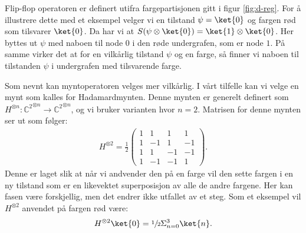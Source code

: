         Flip-flop operatoren er definert utifra fargepartisjonen gitt i figur \ref{fig:d-reg}. For å illustrere dette med et eksempel velger vi en tilstand $\psi=\ket{0}$ og fargen rød som tilsvarer $\ket{0}$. Da har vi at $S(\psi\otimes\ket{0})=\ket{1}\otimes\ket{0}$. Her byttes ut $\psi$ med naboen til node $0$ i den røde undergrafen, som er node $1$. På samme virker det at for en vilkårlig tilstand $\psi$ og en farge, så finner vi naboen til tilstanden $\psi$ i undergrafen med tilsvarende farge.

        Som nevnt kan myntoperatoren velges mer vilkårlig. I vårt tilfelle kan vi velge en mynt som kalles for Hadamardmynten. Denne mynten er generelt definert som $H^{\otimes n}:{\mathbb{C}^2}^{\otimes n}\rightarrow{\mathbb{C}^2}^{\otimes n}$, og vi bruker varianten hvor $n=2$. Matrisen for denne mynten ser ut som følger:
        \begin{align*}
            H^{\otimes 2} = \frac{1}{2}\begin{pmatrix}
                1 & 1 & 1 & 1 \\
                1 & -1 & 1 & -1 \\
                1 & 1 & -1 & -1 \\
                1 & -1 & -1 & 1
            \end{pmatrix}.
        \end{align*}
        Denne er laget slik at når vi andvender den på en farge vil den sette fargen i en ny tilstand som er en likevektet superposisjon av alle de andre fargene. Her kan fasen være forskjellig, men det endrer ikke utfallet av et steg. Som et eksempel vil $H^{\otimes 2}$ anvendet på fargen rød være:
        \begin{align*}
            H^{\otimes 2}\ket{0} = \sfrac{1}{2}\Sigma_{n=0}^3\ket{n}.
        \end{align*}

